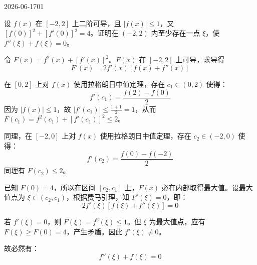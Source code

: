 \begin{mistake}{2026-06-17}{01}

\begin{problemcontent}
设 \(f(x)\) 在 \([-2, 2]\) 上二阶可导，且 \(|f(x)| \leqslant 1\)，又 \([f(0)]^2 + [f'(0)]^2 = 4\)。证明在 \((-2, 2)\) 内至少存在一点 \(\xi\)，使 \(f''(\xi) + f(\xi) = 0\)。
\end{problemcontent}

\begin{solutioncontent}
令 \(F(x) = f^2(x) + [f'(x)]^2\)。\(F(x)\) 在 \([-2, 2]\) 上可导，求导得
\[
F'(x) = 2f'(x)[f(x) + f''(x)]
\]

在 \([0, 2]\) 上对 \(f(x)\) 使用拉格朗日中值定理，存在 \(c_1 \in (0, 2)\) 使得：
\[
f'(c_1) = \frac{f(2) - f(0)}{2}
\]
因为 \(|f(x)| \leqslant 1\)，故 \(|f'(c_1)| \leqslant \frac{1+1}{2} = 1\)，从而 \(F(c_1) = f^2(c_1) + [f'(c_1)]^2 \leqslant 2\)。

同理，在 \([-2, 0]\) 上对 \(f(x)\) 使用拉格朗日中值定理，存在 \(c_2 \in (-2, 0)\) 使得：
\[
f'(c_2) = \frac{f(0) - f(-2)}{2}
\]
同理有 \(F(c_2) \leqslant 2\)。

已知 \(F(0) = 4\)，所以在区间 \([c_2, c_1]\) 上，\(F(x)\) 必在内部取得最大值。设最大值点为 \(\xi \in (c_2, c_1)\)，根据费马引理，知 \(F'(\xi) = 0\)，即：
\[
2f'(\xi)[f(\xi) + f''(\xi)] = 0
\]

若 \(f'(\xi) = 0\)，则 \(F(\xi) = f^2(\xi) \leqslant 1\)。但 \(\xi\) 为最大值点，应有 \(F(\xi) \geqslant F(0) = 4\)，产生矛盾。因此 \(f'(\xi) \neq 0\)。

故必然有：
\[
f''(\xi) + f(\xi) = 0
\]
\end{solutioncontent}


\end{mistake}
